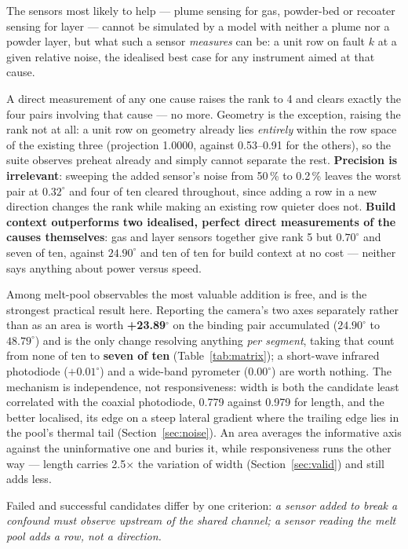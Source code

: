 \documentclass[preprint,times]{elsarticle}
\begin{document}
The sensors most likely to help --- plume sensing for gas, powder-bed or
recoater sensing for layer \cite{Liu2022,Bugatti2022} --- cannot be simulated by
a model with neither a plume nor a powder layer, but what such a sensor
\emph{measures} can be: a unit row on fault $k$ at a given relative noise, the
idealised best case for any instrument aimed at that cause.

A direct measurement of any one cause raises the rank to 4 and clears exactly the
four pairs involving that cause --- no more. Geometry is the exception, raising
the rank not at all: a unit row on geometry already lies \emph{entirely} within
the row space of the existing three (projection 1.0000, against 0.53--0.91 for
the others), so the suite observes preheat already and simply cannot separate the
rest. \textbf{Precision is irrelevant}: sweeping the added sensor's noise from
50\,\% to 0.2\,\% leaves the worst pair at $0.32^\circ$ and four of ten cleared
throughout, since adding a row in a new direction changes the rank while making
an existing row quieter does not. \textbf{Build context outperforms two
idealised, perfect direct measurements of the causes themselves}: gas and layer
sensors together give rank 5 but $0.70^\circ$ and seven of ten, against
$24.90^\circ$ and ten of ten for build context at no cost --- neither says
anything about power versus speed.

Among melt-pool observables the most valuable addition is free, and is the
strongest practical result here. Reporting the camera's two axes separately
rather than as an area is worth \textbf{+23.89$^\circ$} on the binding pair
accumulated ($24.90^\circ$ to $48.79^\circ$) and is the only change resolving
anything \emph{per segment}, taking that count from none of ten to \textbf{seven
of ten} (Table~\ref{tab:matrix}); a short-wave infrared photodiode
($+0.01^\circ$) and a wide-band pyrometer ($0.00^\circ$) are worth nothing. The
mechanism is independence, not responsiveness: width is both the candidate least
correlated with the coaxial photodiode, 0.779 against 0.979 for length, and the
better localised, its edge on a steep lateral gradient where the trailing edge
lies in the pool's thermal tail (Section~\ref{sec:noise}). An area averages the
informative axis against the uninformative one and buries it, while
responsiveness runs the other way --- length carries 2.5$\times$ the variation of
width (Section~\ref{sec:valid}) and still adds less.

Failed and successful candidates differ by one criterion: \emph{a sensor added to
break a confound must observe upstream of the shared channel; a sensor reading
the melt pool adds a row, not a direction.}
\end{document}
